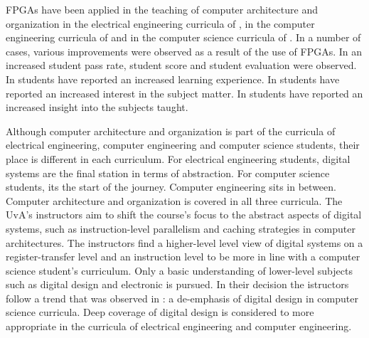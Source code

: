 \documentclass[openright]{template/uva-bachelor-thesis}
\begin{document}


FPGAs have been applied in the teaching of computer architecture and organization in the electrical engineering curricula of \cite{jansen2014every, oztekin2011bzk, el2011teaching, pereira2012basic}, in the computer engineering curricula of \cite{cifredo2015computer, kellett2012project, el2011teaching, pereira2012basic, lee2012pipelined, oztekin2011bzk} and in the computer science curricula of \cite{bulic2013fpga, el2011teaching, pereira2012basic, lee2012pipelined}. In a number of cases, various improvements were observed as a result of the use of FPGAs. In \cite{paharsingh2009novel} an increased student pass rate, student score and student evaluation were observed. In \cite{oztekin2011bzk} students have reported an increased learning experience. In \cite{cifredo2015computer} students have reported an increased interest in the subject matter. In \cite{bulic2013fpga, cifredo2015computer} students have reported an increased insight into the subjects taught. 

Although computer architecture and organization is part of the curricula of electrical engineering, computer engineering and computer science students, their place is different in each curriculum. 
For electrical engineering students, digital systems are the final station in terms of abstraction. For computer science students, its the start of the journey. Computer engineering sits in between. Computer architecture and organization is covered in all three curricula. The UvA's instructors aim to shift the course's focus to the abstract aspects of digital systems, such as instruction-level parallelism and caching strategies in computer architectures. The instructors find a higher-level level view of digital systems on a register-transfer level and an instruction level to be more in line with a computer science student's curriculum. Only a basic understanding of lower-level subjects such as digital design and electronic is pursued. In their decision the istructors follow a trend that was observed in \cite[p. 205]{cs2013final}: a de-emphasis of digital design in computer science curricula. Deep coverage of digital design is considered to more appropriate in the curricula of electrical engineering and computer engineering. 
\end{document}
